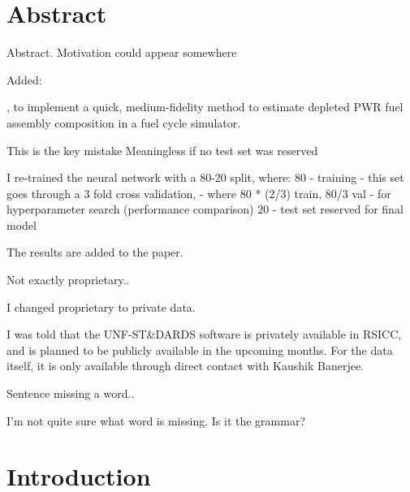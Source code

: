 \documentclass[answers,11pt]{exam}
\begin{document}
\section*{Abstract}
\begin{questions}

        \question Abstract. Motivation could appear somewhere

        \begin{solution}
        	Added:
            
            , to implement a quick, medium-fidelity method to
            estimate depleted \gls{PWR} fuel assembly composition in a fuel
            cycle simulator.
        \end{solution}

        \question
        This is the key mistake Meaningless if no test set was reserved

        \begin{solution}
         I re-trained the neural network with a 80-20 split, where:
         80 - training
            - this set goes through a 3 fold cross validation,
            - where 80 * (2/3) train, 80/3 val
            - for hyperparameter search (performance comparison)
         20 - test set reserved for final model

         The results are added to the paper. 

        \end{solution}

        \question
        Not exactly proprietary..

        \begin{solution}
        I changed proprietary to private data.

        I was told that the UNF-ST\&DARDS software is privately available
        in RSICC, and is planned to be publicly available in the upcoming
        months. For the data itself, it is only available through direct
        contact with Kaushik Banerjee.
        \end{solution}

        \question
        Sentence missing a word..


        \begin{solution}
        I'm not quite sure what word is missing. Is it the grammar?
        \end{solution}

\section*{Introduction}


\end{questions}
\end{document}
